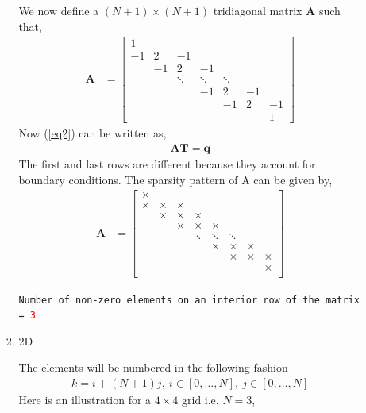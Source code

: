 \documentclass[12 pt, final]{article}
\renewcommand{\d}{\times}
\begin{document}
\begin{itemize}
\begin{itemize}
\begin{enumerate}
                We now define a $(N+1)\times(N+1)$ tridiagonal matrix $\mathbf{A}$ such that,
                \begin{align*}
                    \mathbf{A} &= \begin{bmatrix} 
                    1 \\
                    -1 & 2 & -1  \\
                    & -1 & 2 & -1  \\
                    && \ddots & \ddots & \ddots\\
                    &&& -1 & 2 & -1\\
                    &&&& -1 & 2 & -1\\
                    &&&&&& 1
                    \end{bmatrix}
                \end{align*}
                Now (\ref{eq2}) can be written as,
                \begin{align*}
                    \mathbf{AT} = \mathbf{q}
                \end{align*}
                The first and last rows are different because they account for boundary conditions.
                The sparsity pattern of A can be given by,
                \begin{align*}
                    \mathbf{A} &= \begin{bmatrix} 
                    \d \\
                    \d & \d & \d  \\
                    & \d & \d & \d  \\
                    && \d & \d & \d\\
                    &&& \ddots & \ddots & \ddots\\
                    &&&& \d & \d & \d\\
                    &&&&& \d & \d & \d\\
                    &&&&&&& \d\\
                    \end{bmatrix}
                \end{align*} 
                
                \texttt{Number of non-zero elements on an interior row of the matrix = \textcolor{red}{3}}  
                
                \item 2D
                
                The elements will be numbered in the following fashion
                \begin{align*}
                    k = i + (N+1)j, \:i \in [0,\hdots,N] , \:j \in [0,\hdots,N] 
                \end{align*}
                Here is an illustration for a $4\times4$ grid i.e. $N=3$,\\
                

\end{enumerate}
\end{itemize}
\end{itemize}
\end{document}
